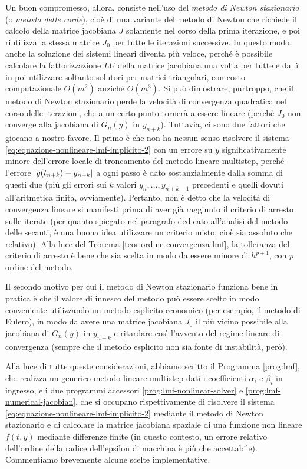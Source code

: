 Un buon compromesso, allora, consiste nell'uso del \emph{metodo di Newton stazionario}
(o \emph{metodo delle corde}), cioè di una variante del metodo di Newton che
richiede il calcolo della matrice jacobiana $J$ solamente nel corso della
prima iterazione, e poi riutilizza la stessa matrice $J_0$ per tutte le
iterazioni successive. In questo modo, anche la soluzione dei sistemi lineari
diventa più veloce, perché è possibile calcolare la fattorizzazione $LU$
della matrice jacobiana una volta per tutte e da lì in poi utilizzare
soltanto solutori per matrici triangolari, con costo computazionale $O(m^2)$
anziché $O(m^3)$.
Si può dimostrare, purtroppo, che il metodo di Newton stazionario perde
la velocità di convergenza quadratica nel corso delle iterazioni, che
a un certo punto tornerà a essere lineare (perché $J_0$ non converge alla
jacobiana di $G_n(y)$ in $y_{n+k}$).
Tuttavia, ci sono due fattori che giocano a nostro favore.
Il primo è che non ha nessun senso risolvere il sistema
\eqref{eq:equazione-nonlineare-lmf-implicito-2} con un errore su $y$
significativamente minore dell'errore locale di troncamento del metodo
lineare multistep, perché l'errore $\left\lvert y(t_{n+k})-y_{n+k}\right\rvert$ a ogni passo è
dato sostanzialmente dalla somma di questi due (più gli errori sui
$k$ valori $y_n, \dots, y_{n+k-1}$ precedenti e quelli dovuti all'aritmetica
finita, ovviamente). Pertanto, non è detto che la velocità di convergenza lineare
si manifesti prima di aver già raggiunto il criterio di arresto sulle
iterate (per quanto spiegato nel paragrafo dedicato all'analisi del metodo
delle secanti, è una buona idea utilizzare un criterio misto, cioè sia
assoluto che relativo). Alla luce del Teorema \ref{teor:ordine-convergenza-lmf},
la tolleranza del criterio di arresto è bene che sia scelta in modo da
essere minore di $h^{p+1}$, con $p$ ordine del metodo.

Il secondo motivo per cui il metodo di Newton stazionario funziona bene
in pratica è che il valore di innesco del metodo può essere scelto in modo
conveniente utilizzando un metodo esplicito economico (per esempio, il
metodo di Eulero), in modo da avere una matrice jacobiana $J_0$
il più vicino possibile alla jacobiana di $G_n(y)$ in $y_{n+k}$
e ritardare così l'avvento del regime lineare di convergenza (sempre che
il metodo esplicito non sia fonte di instabilità, però).

Alla luce di tutte queste considerazioni, abbiamo scritto il Programma
\ref{prog:lmf}, che realizza un generico metodo lineare multistep
dati i coefficienti $\alpha_i$ e $\beta_i$ in ingresso,
e i due programmi accessori \ref{prog:lmf-nonlinear-solver}
e \ref{prog:lmf-numerical-jacobian}, che si occupano rispettivamente
di risolvere il sistema \eqref{eq:equazione-nonlineare-lmf-implicito-2}
mediante il metodo di Newton stazionario e di calcolare la matrice jacobiana
spaziale di una funzione non lineare $f(t,y)$ mediante differenze finite
(in questo contesto, un errore relativo dell'ordine della radice
dell'epsilon di macchina è più che accettabile).
Commentiamo brevemente alcune scelte implementative.


